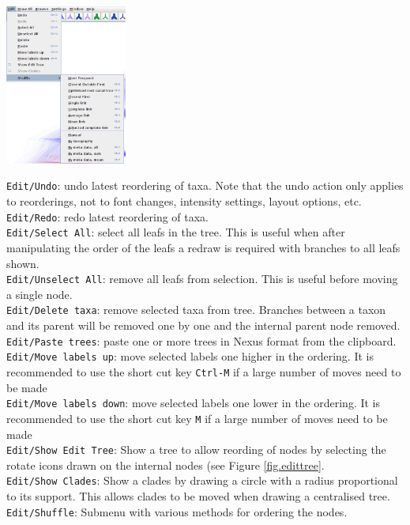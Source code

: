 \documentclass{article}
\begin{document}
\begin{center}
\includegraphics[width=4cm]{menuedit.png}
\end{center}

\noindent
{\tt Edit/Undo}: undo latest reordering of taxa. Note that the undo action only applies
to reorderings, not to font changes, intensity settings, layout options, etc.\\
{\tt Edit/Redo}: redo latest reordering of taxa.\\
{\tt Edit/Select All}: select all leafs in the tree. This is useful when after manipulating
the order of the leafs a redraw is required with branches to all leafs shown.\\
{\tt Edit/Unselect All}: remove all leafs from selection. This is useful before moving a single
node.\\
{\tt Edit/Delete taxa}: remove selected taxa from tree. Branches between a taxon and its parent
will be removed one by one and the internal parent node removed.\\
{\tt Edit/Paste trees}: paste one or more trees in Nexus format from the clipboard.\\
{\tt Edit/Move labels up}: move selected labels one higher in the ordering. It is recommended to
use the short cut key {\tt Ctrl-M} if a large number of moves need to be made\\
{\tt Edit/Move labels down}: move selected labels one lower in the ordering. It is recommended to
use the short cut key {\tt M} if a large number of moves need to be made\\
{\tt Edit/Show Edit Tree}: Show a tree to allow reording of nodes by selecting the rotate icons
drawn on the internal nodes (see Figure \ref{fig.edittree}.\\
{\tt Edit/Show Clades}: Show a clades by drawing a circle with a radius proportional to its
support. This allows clades to be moved when drawing a centralised tree.\\
{\tt Edit/Shuffle}: Submenu with various methods for ordering the nodes.\\
\end{document}
